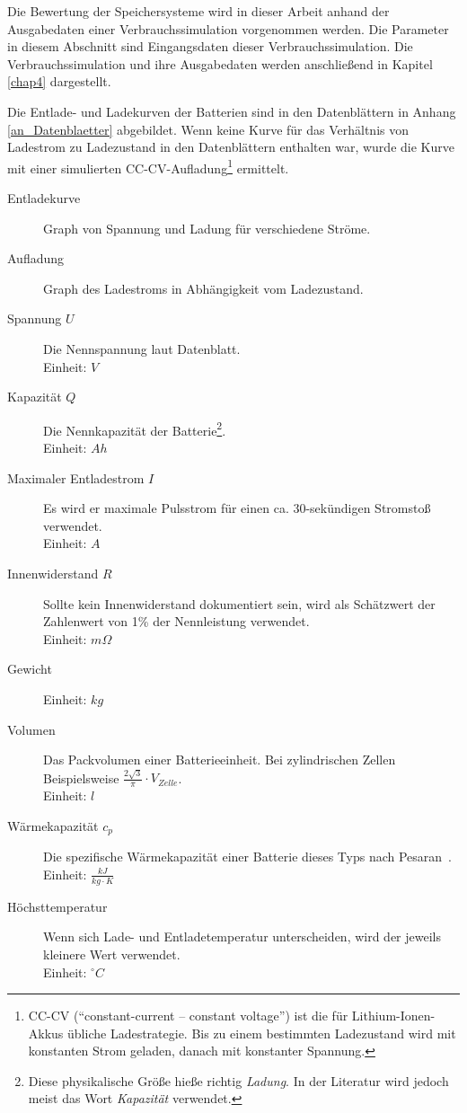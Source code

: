 Die Bewertung der Speichersysteme wird in dieser Arbeit anhand der Ausgabedaten einer Verbrauchssimulation vorgenommen werden. Die Parameter in diesem Abschnitt sind Eingangsdaten dieser Verbrauchssimulation. Die Verbrauchssimulation und ihre Ausgabedaten werden anschließend in Kapitel \ref{chap4} dargestellt.

Die Entlade- und Ladekurven der Batterien sind in den Datenblättern in Anhang \ref{an_Datenblaetter} abgebildet. Wenn keine Kurve für das Verhältnis von Ladestrom zu Ladezustand in den Datenblättern enthalten war, wurde die Kurve mit einer simulierten CC-CV-Aufladung\footnote{CC-CV ("`constant-current – constant voltage"') ist die für Lithium-Ionen-Akkus übliche Ladestrategie. Bis zu einem bestimmten Ladezustand wird mit konstanten Strom geladen, danach mit konstanter Spannung.} ermittelt.
\begin{description}
	\item[Entladekurve] Graph von Spannung und Ladung für verschiedene Ströme.
	\item[Aufladung] Graph des Ladestroms in Abhängigkeit vom Ladezustand.
	\item[Spannung $U$] Die Nennspannung laut Datenblatt.\\
	Einheit: $V$
	\item[Kapazität $Q$] Die Nennkapazität der Batterie\footnote{Diese physikalische Größe hieße richtig \emph{Ladung}. In der Literatur wird jedoch meist das Wort \emph{Kapazität} verwendet.}.\\
	Einheit: $Ah$
	\item[Maximaler Entladestrom $I$] Es wird er maximale Pulsstrom für einen ca. 30-sekündigen Stromstoß verwendet.\\
	Einheit: $A$
	\item[Innenwiderstand $R$] Sollte kein Innenwiderstand dokumentiert sein, wird als Schätzwert der Zahlenwert von 1\% der Nennleistung verwendet.\\
	Einheit: $m\Omega$
	\item[Gewicht] Einheit: $kg$
	\item[Volumen] Das Packvolumen einer Batterieeinheit. Bei zylindrischen Zellen Beispielsweise $\frac{2\sqrt{3}}{\pi} \cdot V_{Zelle}$.\\
	Einheit: $l$
	\item[Wärmekapazität $c_p$] Die spezifische Wärmekapazität einer Batterie dieses Typs nach Pesaran~\cite{pesaran2001battery}.\\
	Einheit: $\frac{kJ}{kg\cdot K}$
	\item[Höchsttemperatur] Wenn sich Lade- und Entladetemperatur unterscheiden, wird der jeweils kleinere Wert verwendet.\\
	Einheit: $^{\circ}C$
\end{description}


